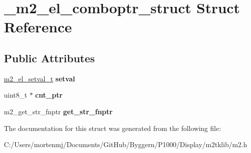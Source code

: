 \hypertarget{struct__m2__el__comboptr__struct}{\section{\-\_\-m2\-\_\-el\-\_\-comboptr\-\_\-struct Struct Reference}
\label{struct__m2__el__comboptr__struct}
}
\subsection*{Public Attributes}
\begin{DoxyCompactItemize}
\item 
\hypertarget{struct__m2__el__comboptr__struct_af7bf66f236bba7d66f2d7b662915130f}{\hyperlink{struct__m2__el__setval__struct}{m2\-\_\-el\-\_\-setval\-\_\-t} {\bfseries setval}}\label{struct__m2__el__comboptr__struct_af7bf66f236bba7d66f2d7b662915130f}

\item 
\hypertarget{struct__m2__el__comboptr__struct_a977267d045840a6916e0575eaeec9aef}{uint8\-\_\-t $\ast$ {\bfseries cnt\-\_\-ptr}}\label{struct__m2__el__comboptr__struct_a977267d045840a6916e0575eaeec9aef}

\item 
\hypertarget{struct__m2__el__comboptr__struct_a23f88ce6fb85bb1c5eef6693b48182c2}{m2\-\_\-get\-\_\-str\-\_\-fnptr {\bfseries get\-\_\-str\-\_\-fnptr}}\label{struct__m2__el__comboptr__struct_a23f88ce6fb85bb1c5eef6693b48182c2}

\end{DoxyCompactItemize}


The documentation for this struct was generated from the following file\-:\begin{DoxyCompactItemize}
\item 
C\-:/\-Users/mortenmj/\-Documents/\-Git\-Hub/\-Byggern/\-P1000/\-Display/m2tklib/m2.\-h\end{DoxyCompactItemize}
